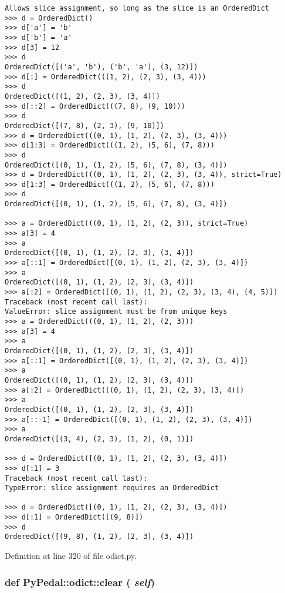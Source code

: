 \footnotesize\begin{verbatim}
Allows slice assignment, so long as the slice is an OrderedDict
>>> d = OrderedDict()
>>> d['a'] = 'b'
>>> d['b'] = 'a'
>>> d[3] = 12
>>> d
OrderedDict([('a', 'b'), ('b', 'a'), (3, 12)])
>>> d[:] = OrderedDict(((1, 2), (2, 3), (3, 4)))
>>> d
OrderedDict([(1, 2), (2, 3), (3, 4)])
>>> d[::2] = OrderedDict(((7, 8), (9, 10)))
>>> d
OrderedDict([(7, 8), (2, 3), (9, 10)])
>>> d = OrderedDict(((0, 1), (1, 2), (2, 3), (3, 4)))
>>> d[1:3] = OrderedDict(((1, 2), (5, 6), (7, 8)))
>>> d
OrderedDict([(0, 1), (1, 2), (5, 6), (7, 8), (3, 4)])
>>> d = OrderedDict(((0, 1), (1, 2), (2, 3), (3, 4)), strict=True)
>>> d[1:3] = OrderedDict(((1, 2), (5, 6), (7, 8)))
>>> d
OrderedDict([(0, 1), (1, 2), (5, 6), (7, 8), (3, 4)])

>>> a = OrderedDict(((0, 1), (1, 2), (2, 3)), strict=True)
>>> a[3] = 4
>>> a
OrderedDict([(0, 1), (1, 2), (2, 3), (3, 4)])
>>> a[::1] = OrderedDict([(0, 1), (1, 2), (2, 3), (3, 4)])
>>> a
OrderedDict([(0, 1), (1, 2), (2, 3), (3, 4)])
>>> a[:2] = OrderedDict([(0, 1), (1, 2), (2, 3), (3, 4), (4, 5)])
Traceback (most recent call last):
ValueError: slice assignment must be from unique keys
>>> a = OrderedDict(((0, 1), (1, 2), (2, 3)))
>>> a[3] = 4
>>> a
OrderedDict([(0, 1), (1, 2), (2, 3), (3, 4)])
>>> a[::1] = OrderedDict([(0, 1), (1, 2), (2, 3), (3, 4)])
>>> a
OrderedDict([(0, 1), (1, 2), (2, 3), (3, 4)])
>>> a[:2] = OrderedDict([(0, 1), (1, 2), (2, 3), (3, 4)])
>>> a
OrderedDict([(0, 1), (1, 2), (2, 3), (3, 4)])
>>> a[::-1] = OrderedDict([(0, 1), (1, 2), (2, 3), (3, 4)])
>>> a
OrderedDict([(3, 4), (2, 3), (1, 2), (0, 1)])

>>> d = OrderedDict([(0, 1), (1, 2), (2, 3), (3, 4)])
>>> d[:1] = 3
Traceback (most recent call last):
TypeError: slice assignment requires an OrderedDict

>>> d = OrderedDict([(0, 1), (1, 2), (2, 3), (3, 4)])
>>> d[:1] = OrderedDict([(9, 8)])
>>> d
OrderedDict([(9, 8), (1, 2), (2, 3), (3, 4)])
\end{verbatim}
\normalsize
 

Definition at line 320 of file odict.py.\hypertarget{namespacePyPedal_1_1odict_04614582b6a6c350a0d985b7170a73a1}{
\subsubsection{\setlength{\rightskip}{0pt plus 5cm}def PyPedal::odict::clear ( {\em self})}}
\label{namespacePyPedal_1_1odict_04614582b6a6c350a0d985b7170a73a1}




